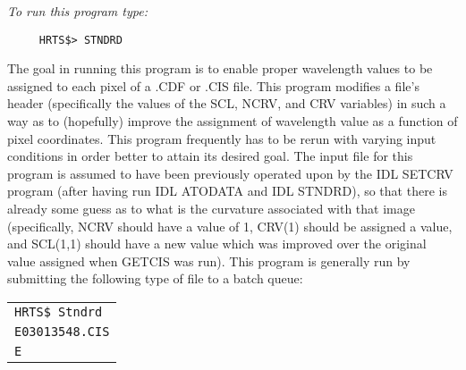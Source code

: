 {\em To run this program type:}
\begin{verbatim}   
     HRTS$> STNDRD      
\end{verbatim}
      The goal in running this program is to enable proper wavelength
   values to be assigned to each pixel of a .CDF or .CIS file.  This
   program modifies a file's header (specifically the values of the SCL,
   NCRV, and CRV variables) in such a way as to (hopefully) improve the
   assignment of wavelength value as a function of pixel coordinates.
   This program frequently has to be rerun with varying input conditions
   in order better to attain its desired goal.
      The input file for this program is assumed to have been previously
   operated upon by the IDL SETCRV program (after having run IDL ATODATA
   and IDL STNDRD), so that there is already some guess as to what is the
   curvature associated with that image (specifically, NCRV should have a
   value of 1, CRV(1) should be assigned a value, and SCL(1,1) should have
   a new value which was improved over the original value assigned when
   GETCIS was run).
      This program is generally run by submitting the following type of
    file to a batch queue:
\begin{center}      
\begin{tabular}{||l||}   
\hline   

                   {\tt HRTS\$ Stndrd} \\                            
                   {\tt E03013548.CIS}\\                        
                   {\tt E} \\
\hline
\end{tabular}
\end{center}   

